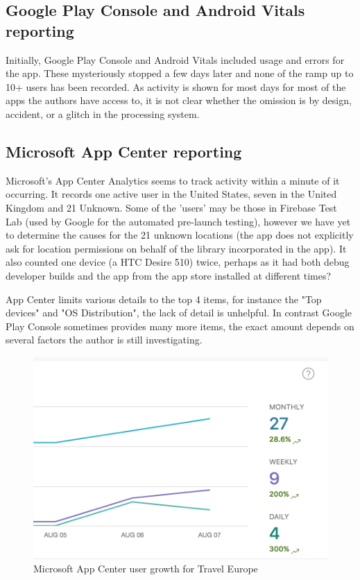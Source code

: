 \subsection{Google Play Console and Android Vitals reporting}
Initially, Google Play Console and Android Vitals included usage and errors for the app. These mysteriously stopped a few days later and none of the ramp up to 10+ users has been recorded. As activity is shown for most days for most of the apps the authors have access to, it is not clear whether the omission is by design, accident, or a glitch in the processing system.

\subsection{Microsoft App Center reporting}
Microsoft's App Center Analytics seems to track activity within a minute of it occurring. It records one active user in the United States, seven in the United Kingdom and 21 Unknown. Some of the 'users' may be those in Firebase Test Lab (used by Google for the automated pre-launch testing), however we have yet to determine the causes for the 21 unknown locations (the app does not explicitly ask for location permissions on behalf of the  library incorporated in the app). It also counted one device (a HTC Desire 510) twice, perhaps as it had both debug developer builds and the app from the app store installed at different times?

App Center limits various details to the top 4 items, for instance the "Top devices" and "OS Distribution", the lack of detail is unhelpful. In contrast Google Play Console sometimes provides many more items, the exact amount depends on several factors the author is still investigating.

\begin{figure}
    \centering
    \includegraphics[width=\linewidth]{images/microsoft-app-center/AppCenter_snippet_growth_for_test_app_2019_Aug_07.png}
    \caption{Microsoft App Center user growth for Travel Europe}
    \label{fig:appcenter_user_growth}
\end{figure}


